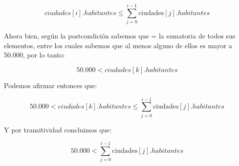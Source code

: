 \documentclass[10pt,a4paper]{article}
\begin{document}
\[
\textit{ciudades}[i].habitantes \leq \sum_{j=0}^{i-1} \text{ciudades}[j].habitantes 
\]

Ahora bien, según la postcondición sabemos que  = la sumatoria de todos sus elementos, entre los cuales sabemos que al menos alguno de ellos es mayor a 50.000, por lo tanto:


\[
50.000 < \textit{ciudades}[k].habitantes  
\]

Podemos afirmar entonces que:

\[
50.000 < \textit{ciudades}[k].habitantes \leq \sum_{j=0}^{i-1} \text{ciudades}[j].habitantes 
\]

Y por transitividad concluimos que:

\[
50.000 < \sum_{j=0}^{i-1} \text{ciudades}[j].habitantes
\]
\end{document}
